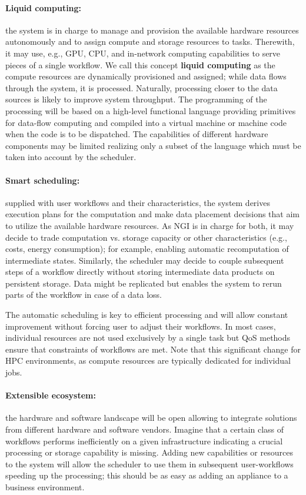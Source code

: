 \documentclass[a4paper, twocolumn]{article}
\begin{document}
\paragraph{Liquid computing:}
the system is in charge to manage and provision the available hardware resources autonomously and to assign compute and storage resources to tasks.
Therewith, it may use, e.g., GPU, CPU, and in-network computing capabilities to serve pieces of a single workflow.
We call this concept \textbf{liquid computing} as the compute resources are dynamically provisioned and assigned; while data flows through the system, it is processed.
Naturally, processing closer to the data sources is likely to improve system throughput.
The programming of the processing will be based on a high-level functional language providing primitives for data-flow computing and compiled into a virtual machine or machine code when the code is to be dispatched.
The capabilities of different hardware components may be limited realizing only a subset of the language which must be taken into account by the scheduler.


\paragraph{Smart scheduling:}
supplied with user workflows and their characteristics, the system derives execution plans for the computation and make data placement decisions that aim to utilize the available hardware resources.
As NGI is in charge for both, it may decide to trade computation vs. storage capacity or other characteristics (e.g., costs, energy consumption); for example, enabling automatic recomputation of intermediate states.
Similarly, the scheduler may decide to couple subsequent steps of a workflow directly without storing intermediate data products on persistent storage.
Data might be replicated but enables the system to rerun parts of the workflow in case of a data loss.

The automatic scheduling is key to efficient processing and will allow constant improvement without forcing user to adjust their workflows.
In most cases, individual resources are not used exclusively by a single task but QoS methods ensure that constraints of workflows are met.
Note that this significant change for HPC environments, as compute resources are typically dedicated for individual jobs.

\paragraph{Extensible ecosystem:}
the hardware and software landscape will be open allowing to integrate solutions from different hardware and software vendors.
Imagine that a certain class of workflows performs inefficiently on a given infrastructure indicating a crucial processing or storage capability is missing.
Adding new capabilities or resources to the system will allow the scheduler to use them in subsequent user-workflows speeding up the processing; this should be as easy as adding an appliance to a business environment.
\end{document}
